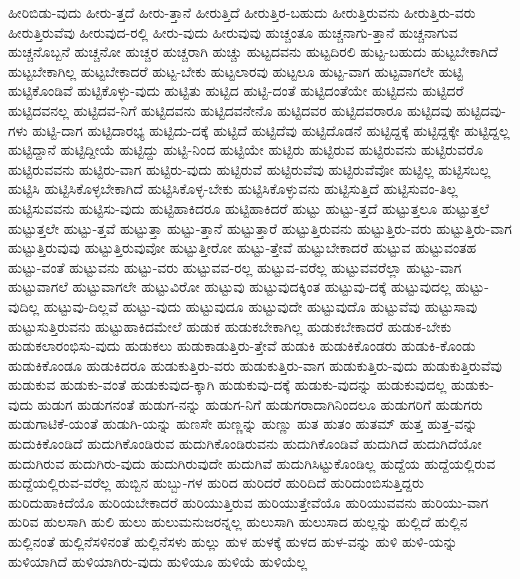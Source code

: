 {ಹೀರಿಬಿಡು-ವುದು
ಹೀರು-ತ್ತದೆ
ಹೀರು-ತ್ತಾನೆ
ಹೀರುತ್ತಿದೆ
ಹೀರುತ್ತಿರ-ಬಹುದು
ಹೀರುತ್ತಿರುವನು
ಹೀರುತ್ತಿರು-ವರು
ಹೀರುತ್ತಿರುವೆವು
ಹೀರುವುದ-ರಲ್ಲಿ
ಹೀರು-ವುದು
ಹೀರುವುವು
ಹುಚ್ಚಂತೂ
ಹುಚ್ಚನಾಗು-ತ್ತಾನೆ
ಹುಚ್ಚನಾಗುವ
ಹುಚ್ಚನೊಬ್ಬನೆ
ಹುಚ್ಚನೋ
ಹುಚ್ಚರ
ಹುಚ್ಚರಾಗಿ
ಹುಚ್ಚು
ಹುಟ್ಟದವನು
ಹುಟ್ಟದಿರಲಿ
ಹುಟ್ಟ-ಬಹುದು
ಹುಟ್ಟಬೇಕಾಗಿದೆ
ಹುಟ್ಟಬೇಕಾಗಿಲ್ಲ
ಹುಟ್ಟಬೇಕಾದರೆ
ಹುಟ್ಟ-ಬೇಕು
ಹುಟ್ಟಲಾರವು
ಹುಟ್ಟಲೂ
ಹುಟ್ಟ-ವಾಗ
ಹುಟ್ಟವಾಗಲೇ
ಹುಟ್ಟಿ
ಹುಟ್ಟಿಕೊಂಡಿವೆ
ಹುಟ್ಟಿಕೊಳ್ಳು-ವುದು
ಹುಟ್ಟಿತು
ಹುಟ್ಟಿದ
ಹುಟ್ಟಿ-ದಂತೆ
ಹುಟ್ಟಿದಂತೆಯೇ
ಹುಟ್ಟಿದನು
ಹುಟ್ಟಿದರೆ
ಹುಟ್ಟಿದವನಲ್ಲ
ಹುಟ್ಟಿದವ-ನಿಗೆ
ಹುಟ್ಟಿದವನು
ಹುಟ್ಟಿದವನೇನೊ
ಹುಟ್ಟಿದವರ
ಹುಟ್ಟಿದವರಾರೂ
ಹುಟ್ಟಿದವು
ಹುಟ್ಟಿದವು-ಗಳು
ಹುಟ್ಟಿ-ದಾಗ
ಹುಟ್ಟಿದಾರಭ್ಯ
ಹುಟ್ಟಿದು-ದಕ್ಕೆ
ಹುಟ್ಟಿದೆ
ಹುಟ್ಟಿದೆವು
ಹುಟ್ಟಿದೊಡನೆ
ಹುಟ್ಟಿದ್ದಕ್ಕೆ
ಹುಟ್ಟಿದ್ದಕ್ಕೇ
ಹುಟ್ಟಿದ್ದಲ್ಲ
ಹುಟ್ಟಿದ್ದಾನೆ
ಹುಟ್ಟಿದ್ದೀಯೆ
ಹುಟ್ಟಿದ್ದು
ಹುಟ್ಟಿ-ನಿಂದ
ಹುಟ್ಟಿಯೇ
ಹುಟ್ಟಿರು
ಹುಟ್ಟಿರುವ
ಹುಟ್ಟಿರುವನು
ಹುಟ್ಟಿರುವರೊ
ಹುಟ್ಟಿರುವವನು
ಹುಟ್ಟಿರು-ವಾಗ
ಹುಟ್ಟಿರು-ವುದು
ಹುಟ್ಟಿರುವೆ
ಹುಟ್ಟಿರುವೆವು
ಹುಟ್ಟಿರುವೆವೋ
ಹುಟ್ಟಿಲ್ಲ
ಹುಟ್ಟಿಸಬಲ್ಲ
ಹುಟ್ಟಿಸಿ
ಹುಟ್ಟಿಸಿಕೊಳ್ಳಬೇಕಾಗಿದೆ
ಹುಟ್ಟಿಸಿಕೊಳ್ಳ-ಬೇಕು
ಹುಟ್ಟಿಸಿಕೊಳ್ಳುವನು
ಹುಟ್ಟಿಸುತ್ತಿದೆ
ಹುಟ್ಟಿಸುವಂ-ತಿಲ್ಲ
ಹುಟ್ಟಿಸುವವನು
ಹುಟ್ಟಿಸು-ವುದು
ಹುಟ್ಟಿಹಾಕಿದರೂ
ಹುಟ್ಟಿಹಾಕಿದರೆ
ಹುಟ್ಟು
ಹುಟ್ಟು-ತ್ತದೆ
ಹುಟ್ಟುತ್ತಲೂ
ಹುಟ್ಟುತ್ತಲೆ
ಹುಟ್ಟುತ್ತಲೇ
ಹುಟ್ಟು-ತ್ತವೆ
ಹುಟ್ಟುತ್ತಾ
ಹುಟ್ಟು-ತ್ತಾನೆ
ಹುಟ್ಟುತ್ತಾರೆ
ಹುಟ್ಟುತ್ತಿರುವನು
ಹುಟ್ಟುತ್ತಿರು-ವರು
ಹುಟ್ಟುತ್ತಿರು-ವಾಗ
ಹುಟ್ಟುತ್ತಿರುವುವು
ಹುಟ್ಟುತ್ತಿರುವುವೋ
ಹುಟ್ಟುತ್ತೀರೋ
ಹುಟ್ಟು-ತ್ತೇವೆ
ಹುಟ್ಟುಬೇಕಾದರೆ
ಹುಟ್ಟುವ
ಹುಟ್ಟುವಂತಹ
ಹುಟ್ಟು-ವಂತೆ
ಹುಟ್ಟುವನು
ಹುಟ್ಟು-ವರು
ಹುಟ್ಟುವವ-ರಲ್ಲ
ಹುಟ್ಟುವ-ವರೆಲ್ಲ
ಹುಟ್ಟುವವರೆಲ್ಲಾ
ಹುಟ್ಟು-ವಾಗ
ಹುಟ್ಟುವಾಗಲೆ
ಹುಟ್ಟುವಾಗಲೇ
ಹುಟ್ಟುವಿರೋ
ಹುಟ್ಟುವು
ಹುಟ್ಟುವುದಕ್ಕಿಂತ
ಹುಟ್ಟುವು-ದಕ್ಕೆ
ಹುಟ್ಟುವುದಲ್ಲ
ಹುಟ್ಟು-ವುದಿಲ್ಲ
ಹುಟ್ಟುವು-ದಿಲ್ಲವೆ
ಹುಟ್ಟು-ವುದು
ಹುಟ್ಟುವುದೂ
ಹುಟ್ಟುವುದೇ
ಹುಟ್ಟುವುದೊ
ಹುಟ್ಟುವೆವು
ಹುಟ್ಟುಸಾವು
ಹುಟ್ಟುಸುತ್ತಿರುವನು
ಹುಟ್ಟುಹಾಕಿದಮೇಲೆ
ಹುಡುಕ
ಹುಡುಕಬೇಕಾಗಿಲ್ಲ
ಹುಡುಕಬೇಕಾದರೆ
ಹುಡುಕ-ಬೇಕು
ಹುಡುಕಲಾರಂಭಿಸು-ವುದು
ಹುಡುಕಲು
ಹುಡುಕಾಡುತ್ತಿರು-ತ್ತೇವೆ
ಹುಡುಕಿ
ಹುಡುಕಿಕೊಂಡರು
ಹುಡುಕಿ-ಕೊಂಡು
ಹುಡುಕಿಕೊಂಡೂ
ಹುಡುಕಿದರೂ
ಹುಡುಕುತ್ತಿರು-ವರು
ಹುಡುಕುತ್ತಿರು-ವಾಗ
ಹುಡುಕುತ್ತಿರು-ವುದು
ಹುಡುಕುತ್ತಿರುವೆವು
ಹುಡುಕುವ
ಹುಡುಕು-ವಂತೆ
ಹುಡುಕುವುದ-ಕ್ಕಾಗಿ
ಹುಡುಕುವು-ದಕ್ಕೆ
ಹುಡುಕು-ವುದನ್ನು
ಹುಡುಕುವುದಲ್ಲ
ಹುಡುಕು-ವುದು
ಹುಡುಗ
ಹುಡುಗನಂತೆ
ಹುಡುಗ-ನನ್ನು
ಹುಡುಗ-ನಿಗೆ
ಹುಡುಗರಾದಾಗಿನಿಂದಲೂ
ಹುಡುಗರಿಗೆ
ಹುಡುಗರು
ಹುಡುಗಾಟಿಕೆ-ಯಂತೆ
ಹುಡುಗಿ-ಯನ್ನು
ಹುಣಸೇ
ಹುಣ್ಣನ್ನು
ಹುಣ್ಣು
ಹುತ
ಹುತಂ
ಹುತಮ್
ಹುತ್ತ
ಹುತ್ತ-ವನ್ನು
ಹುದುಕಿಕೊಂಡಿದೆ
ಹುದುಗಿಕೊಂಡಿರುವ
ಹುದುಗಿಕೊಂಡಿರುವನು
ಹುದುಗಿಕೊಂಡಿವೆ
ಹುದುಗಿದೆ
ಹುದುಗಿದೆಯೋ
ಹುದುಗಿರುವ
ಹುದುಗಿರು-ವುದು
ಹುದುಗಿರುವುದೇ
ಹುದುಗಿವೆ
ಹುದುಗಿಸಿಟ್ಟುಕೊಂಡಿಲ್ಲ
ಹುದ್ದೆಯ
ಹುದ್ದೆಯಲ್ಲಿರುವ
ಹುದ್ದೆಯಲ್ಲಿರುವ-ವರೆಲ್ಲ
ಹುಬ್ಬಿನ
ಹುಬ್ಬು-ಗಳ
ಹುರಿದ
ಹುರಿದರೆ
ಹುರಿದಿದೆ
ಹುರಿದುಂಬಿಸುತ್ತಿದ್ದರು
ಹುರಿದುಹಾಕಿದೆಯೊ
ಹುರಿಯಬೇಕಾದರೆ
ಹುರಿಯುತ್ತಿರುವ
ಹುರಿಯುತ್ತೇವೆಯೊ
ಹುರಿಯುವವನು
ಹುರಿಯು-ವಾಗ
ಹುರಿವ
ಹುಲಸಾಗಿ
ಹುಲಿ
ಹುಲು
ಹುಲುಮನುಜರನ್ನಲ್ಲ
ಹುಲುಸಾಗಿ
ಹುಲುಸಾದ
ಹುಲ್ಲನ್ನು
ಹುಲ್ಲಿದೆ
ಹುಲ್ಲಿನ
ಹುಲ್ಲಿನಂತೆ
ಹುಲ್ಲಿನೆಸಳಿನಂತೆ
ಹುಲ್ಲಿನೆಸಳು
ಹುಲ್ಲು
ಹುಳ
ಹುಳಕ್ಕೆ
ಹುಳದ
ಹುಳ-ವನ್ನು
ಹುಳಿ
ಹುಳಿ-ಯನ್ನು
ಹುಳಿಯಾಗಿದೆ
ಹುಳಿಯಾಗಿರು-ವುದು
ಹುಳಿಯೂ
ಹುಳಿಯೆ
ಹುಳಿಯೆಲ್ಲ
}

